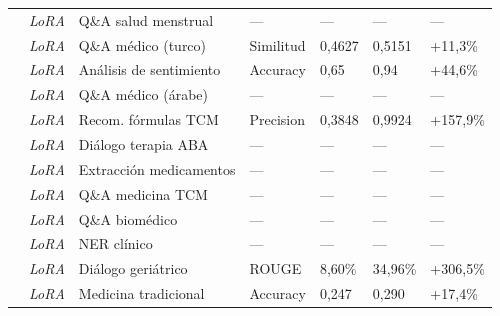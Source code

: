 \begin{longtable}{p{3.5cm} p{1.7cm} p{3.0cm} p{1.8cm} p{1.3cm} p{1.3cm} p{0.9cm}}
\scriptsize\autocite{adhikary2025medical} & \scriptsize\textit{LoRA} & \scriptsize Q\&A salud menstrual & \scriptsize --- & \scriptsize --- & \scriptsize --- & \scriptsize --- \\
\scriptsize\autocite{bayram2025medical} & \scriptsize\textit{LoRA} & \scriptsize Q\&A médico (turco) & \scriptsize Similitud & \scriptsize 0,4627 & \scriptsize 0,5151 & \scriptsize +11,3\% \\
\scriptsize\autocite{elmitwalli2024ft} & \scriptsize\textit{LoRA} & \scriptsize Análisis de sentimiento & \scriptsize Accuracy & \scriptsize 0,65 & \scriptsize 0,94 & \scriptsize +44,6\% \\
\scriptsize\autocite{khader2025ft} & \scriptsize\textit{LoRA} & \scriptsize Q\&A médico (árabe) & \scriptsize --- & \scriptsize --- & \scriptsize --- & \scriptsize --- \\
\scriptsize\autocite{li2025tcmds} & \scriptsize\textit{LoRA} & \scriptsize Recom. fórmulas TCM & \scriptsize Precision & \scriptsize 0,3848 & \scriptsize 0,9924 & \scriptsize +157,9\% \\
\scriptsize\autocite{qi2025transformi} & \scriptsize\textit{LoRA} & \scriptsize Diálogo terapia ABA & \scriptsize --- & \scriptsize --- & \scriptsize --- & \scriptsize --- \\
\scriptsize\autocite{richterpechanski2025medication} & \scriptsize\textit{LoRA} & \scriptsize Extracción medicamentos & \scriptsize --- & \scriptsize --- & \scriptsize --- & \scriptsize --- \\
\scriptsize\autocite{tong2025xuanhugpt} & \scriptsize\textit{LoRA} & \scriptsize Q\&A medicina TCM & \scriptsize --- & \scriptsize --- & \scriptsize --- & \scriptsize --- \\
\scriptsize\autocite{tran2024bioinstruct} & \scriptsize\textit{LoRA} & \scriptsize Q\&A biomédico & \scriptsize --- & \scriptsize --- & \scriptsize --- & \scriptsize --- \\
\scriptsize\autocite{vithanage2025medical} & \scriptsize\textit{LoRA} & \scriptsize NER clínico & \scriptsize --- & \scriptsize --- & \scriptsize --- & \scriptsize --- \\
\scriptsize\autocite{xu2025cpel} & \scriptsize\textit{LoRA} & \scriptsize Diálogo geriátrico & \scriptsize ROUGE & \scriptsize 8,60\% & \scriptsize 34,96\% & \scriptsize +306,5\% \\
\scriptsize\autocite{yang2024tcmgpt} & \scriptsize\textit{LoRA} & \scriptsize Medicina tradicional & \scriptsize Accuracy & \scriptsize 0,247 & \scriptsize 0,290 & \scriptsize +17,4\% \\

\end{longtable}
